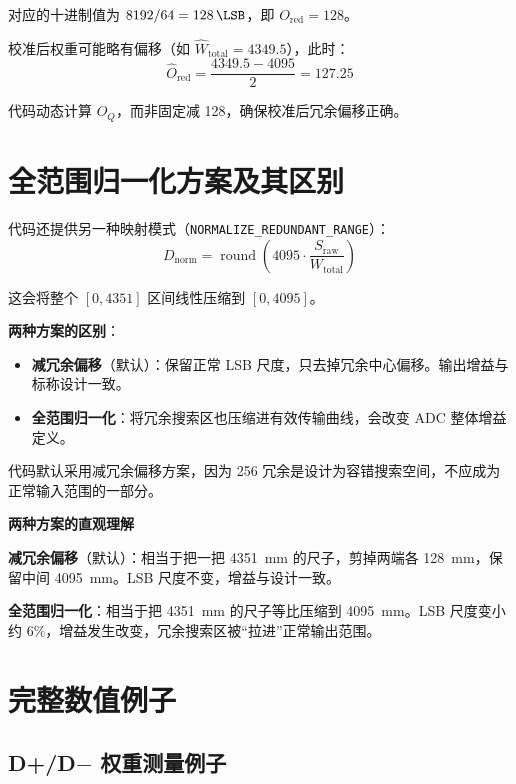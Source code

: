 \documentclass[
  UTF8,
  a4paper,
  11pt,
  oneside,
  fontset=fandol
]{ctexrep}
\newenvironment{tipbox}[1]{%
  \begin{center}
  \begin{minipage}{0.94\textwidth}
  \colorbox{lightteal}{%
    \parbox{0.96\textwidth}{\textbf{#1}}}
  \vspace{0.35em}\par
}{%
  \end{minipage}
  \end{center}
}
\newcommand{\round}{\operatorname{round}}
\newcommand{\code}[1]{\texttt{#1}}
\newcommand{\What}{\widehat{W}}
\newcommand{\roundop}[1]{\round\!\left(#1\right)}
\begin{document}
对应的十进制值为 $8192 / 64 = \SI{128}{\LSB}$，即 $O_{\mathrm{red}} = 128$。

校准后权重可能略有偏移（如 $\What_{\mathrm{total}} = 4349.5$），此时：
\begin{equation}
\hat{O}_{\mathrm{red}} = \frac{4349.5 - 4095}{2} = 127.25
\end{equation}

代码动态计算 $O_Q$，而非固定减 128，确保校准后冗余偏移正确。

\chapter{全范围归一化方案及其区别}

代码还提供另一种映射模式（\code{NORMALIZE\_REDUNDANT\_RANGE}）：
\begin{equation}
D_{\mathrm{norm}} = \roundop{4095 \cdot \frac{S_{\mathrm{raw}}}{W_{\mathrm{total}}}}
\end{equation}

这会将整个 $[0, 4351]$ 区间线性压缩到 $[0, 4095]$。

\textbf{两种方案的区别}：
\begin{itemize}[leftmargin=2em]
    \item \textbf{减冗余偏移}（默认）：保留正常 LSB 尺度，只去掉冗余中心偏移。输出增益与标称设计一致。
    \item \textbf{全范围归一化}：将冗余搜索区也压缩进有效传输曲线，会改变 ADC 整体增益定义。
\end{itemize}

代码默认采用减冗余偏移方案，因为 \SI{256}{\LSB} 冗余是设计为容错搜索空间，不应成为正常输入范围的一部分。

\begin{tipbox}{两种方案的直观理解}
\textbf{减冗余偏移}（默认）：相当于把一把 \SI{4351}{mm} 的尺子，剪掉两端各 \SI{128}{mm}，保留中间 \SI{4095}{mm}。LSB 尺度不变，增益与设计一致。

\textbf{全范围归一化}：相当于把 \SI{4351}{mm} 的尺子等比压缩到 \SI{4095}{mm}。LSB 尺度变小约 6\%，增益发生改变，冗余搜索区被“拉进”正常输出范围。
\end{tipbox}

\chapter{完整数值例子}

\section{D+/D$-$ 权重测量例子}
\end{document}
